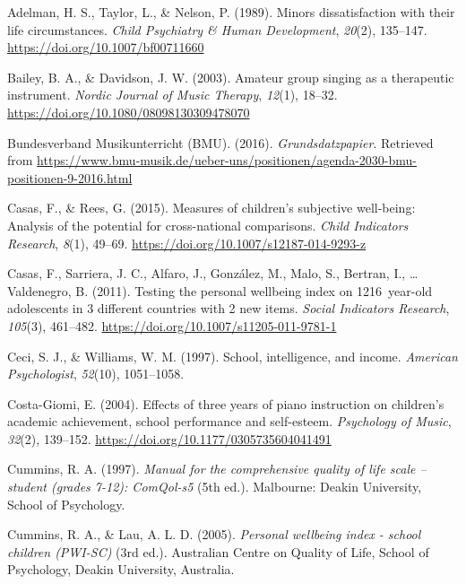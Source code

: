 \documentclass[a4, 12pt]{article}
\begin{document}
\noindent

\hypertarget{refs}{}
\leavevmode\hypertarget{ref-Adelman1989}{}%
Adelman, H. S., Taylor, L., \& Nelson, P. (1989). Minors dissatisfaction with their life circumstances. \emph{Child Psychiatry \& Human Development}, \emph{20}(2), 135--147. \url{https://doi.org/10.1007/bf00711660}

\leavevmode\hypertarget{ref-Bailey2003}{}%
Bailey, B. A., \& Davidson, J. W. (2003). Amateur group singing as a therapeutic instrument. \emph{Nordic Journal of Music Therapy}, \emph{12}(1), 18--32. \url{https://doi.org/10.1080/08098130309478070}

\leavevmode\hypertarget{ref-BundesverbandMusikunterricht}{}%
Bundesverband Musikunterricht (BMU). (2016). \emph{Grundsdatzpapier}. Retrieved from \url{https://www.bmu-musik.de/ueber-uns/positionen/agenda-2030-bmu-positionen-9-2016.html}

\leavevmode\hypertarget{ref-Casas2015}{}%
Casas, F., \& Rees, G. (2015). Measures of children's subjective well-being: Analysis of the potential for cross-national comparisons. \emph{Child Indicators Research}, \emph{8}(1), 49--69. \url{https://doi.org/10.1007/s12187-014-9293-z}

\leavevmode\hypertarget{ref-Casas2011}{}%
Casas, F., Sarriera, J. C., Alfaro, J., González, M., Malo, S., Bertran, I., \ldots{} Valdenegro, B. (2011). Testing the personal wellbeing index on 1216~year-old adolescents in 3 different countries with 2 new items. \emph{Social Indicators Research}, \emph{105}(3), 461--482. \url{https://doi.org/10.1007/s11205-011-9781-1}

\leavevmode\hypertarget{ref-Ceci1997}{}%
Ceci, S. J., \& Williams, W. M. (1997). School, intelligence, and income. \emph{American Psychologist}, \emph{52}(10), 1051--1058.

\leavevmode\hypertarget{ref-CostaGiomi2004}{}%
Costa-Giomi, E. (2004). Effects of three years of piano instruction on children's academic achievement, school performance and self-esteem. \emph{Psychology of Music}, \emph{32}(2), 139--152. \url{https://doi.org/10.1177/0305735604041491}

\leavevmode\hypertarget{ref-Cummins1997}{}%
Cummins, R. A. (1997). \emph{Manual for the comprehensive quality of life scale -- student (grades 7-12): ComQol-s5} (5th ed.). Malbourne: Deakin University, School of Psychology.

\leavevmode\hypertarget{ref-Cummins2005}{}%
Cummins, R. A., \& Lau, A. L. D. (2005). \emph{Personal wellbeing index - school children (PWI-SC)} (3rd ed.). Australian Centre on Quality of Life, School of Psychology, Deakin University, Australia.
\end{document}
